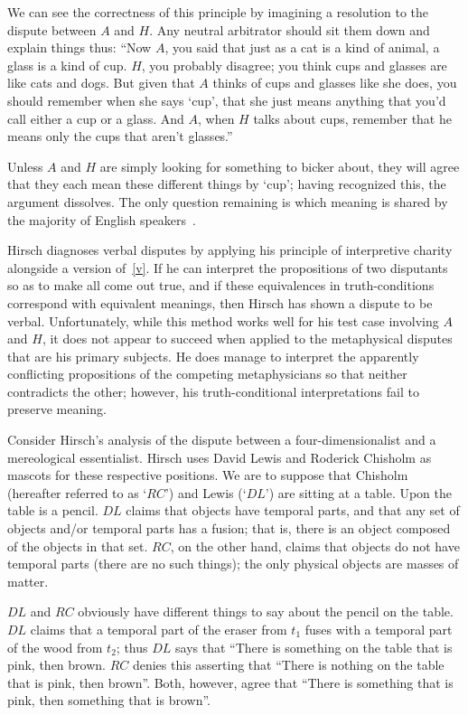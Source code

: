 \documentclass[11pt]{article}
\begin{document}
\begin{spacing}{1.25}
We can see the correctness of this principle by imagining a resolution
to the dispute between $A$ and $H$.  Any neutral arbitrator should
sit them down and explain things thus:  ``Now $A$, you said that just
as a cat is a kind of animal, a glass is a kind of cup.  $H$, you
probably disagree; you think cups and glasses are like cats and
dogs.  But given that $A$ thinks of cups and glasses like she does, you
should remember when she says `cup', that she just means anything that
you'd call either a cup or a glass.  And $A$, when $H$ talks about
cups, remember that he means only the cups that aren't glasses.''

Unless $A$ and $H$ are simply looking for something to bicker about,
they will agree that they each mean these different things by `cup';
having recognized this, the argument dissolves.  The only question
remaining is which meaning is shared by the majority of English
speakers~\citep[70]{hirsch2005}.

Hirsch diagnoses verbal disputes by applying his principle of
interpretive charity alongside a version of~\ref{v}.  If he can
interpret the propositions of two disputants so as to make all come
out true, and if these equivalences in truth-conditions correspond
with equivalent meanings, then Hirsch has shown a dispute to be
verbal.  Unfortunately, while this method works well for his test case
involving $A$ and $H$, it does not appear to succeed when applied to
the metaphysical disputes that are his primary subjects.  He does
manage to interpret the apparently conflicting propositions of the
competing metaphysicians so that neither contradicts the other;
however, his truth-conditional interpretations fail to preserve
meaning.

Consider Hirsch's analysis of the dispute between a
four-dimensionalist and a mereological essentialist.  Hirsch uses
David Lewis and Roderick Chisholm as mascots for these respective
positions.  We are to suppose that Chisholm (hereafter referred to as
`$RC$') and Lewis (`$DL$') are sitting at a table.  Upon the table is
a pencil. $DL$ claims that objects have temporal parts, and that any
set of objects and/or temporal parts has a fusion; that is, there is
an object composed of the objects in that set.  $RC$, on the other
hand, claims that objects do not have temporal parts (there are no
such things); the only physical objects are masses of matter.

$DL$ and $RC$ obviously have different things to say about the pencil
on the table.  $DL$ claims that a temporal part of the eraser from
$t_{1}$ fuses with a temporal part of the wood from $t_{2}$; thus $DL$
says that ``There is something on the table that is pink, then brown.
$RC$ denies this asserting that ``There is nothing on the table that
is pink, then brown''.  Both, however, agree that ``There is something
that is pink, then something that is brown''.


\end{spacing}
\end{document}

